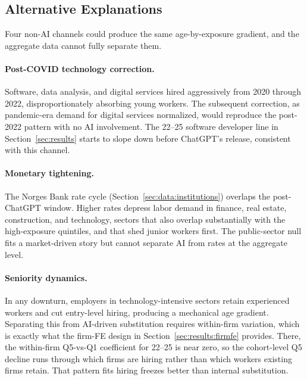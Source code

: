 


\subsection{Alternative Explanations}\label{sec:discussion:alternatives}

Four non-AI channels could produce the same age-by-exposure gradient, and the aggregate data cannot fully separate them.

\paragraph{Post-COVID technology correction.} Software, data analysis, and digital services hired aggressively from 2020 through 2022, disproportionately absorbing young workers. The subsequent correction, as pandemic-era demand for digital services normalized, would reproduce the post-2022 pattern with no AI involvement. The 22--25 software developer line in Section~\ref{sec:results} starts to slope down before ChatGPT's release, consistent with this channel.

\paragraph{Monetary tightening.} The Norges Bank rate cycle (Section~\ref{sec:data:institutions}) overlaps the post-ChatGPT window. Higher rates depress labor demand in finance, real estate, construction, and technology, sectors that also overlap substantially with the high-exposure quintiles, and that shed junior workers first. The public-sector null fits a market-driven story but cannot separate AI from rates at the aggregate level.

\paragraph{Seniority dynamics.} In any downturn, employers in technology-intensive sectors retain experienced workers and cut entry-level hiring, producing a mechanical age gradient. Separating this from AI-driven substitution requires within-firm variation, which is exactly what the firm-FE design in Section~\ref{sec:results:firmfe} provides. There, the within-firm Q5-vs-Q1 coefficient for 22--25 is near zero, so the cohort-level Q5 decline runs through which firms are hiring rather than which workers existing firms retain. That pattern fits hiring freezes better than internal substitution.

